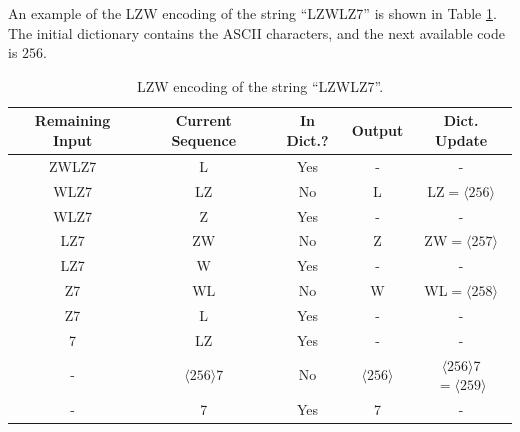 An example of the LZW encoding of the string ``LZWLZ7'' is shown in Table \ref{tab:lzw}. The initial dictionary contains the ASCII characters, and the next available code is $256$.
\begin{table}
    \centering
    \caption{LZW encoding of the string ``LZWLZ7''.}
    \renewcommand{\arraystretch}{1.2}
    \begin{tabular}{|c|c|c|c|c|}
        \hline
        \rowcolor{header}
        \textbf{\color{white}Remaining Input} & \textbf{\color{white}Current Sequence} & \textbf{\color{white}In Dict.?} & \textbf{\color{white}Output} & \textbf{\color{white}Dict. Update} \\ \hline
        ZWLZ7 & L & Yes & - & - \\ \hline\rowcolor{notindict}
        WLZ7 & LZ & No & L & LZ$=\langle256\rangle$ \\ \hline
        WLZ7 & Z & Yes & - & - \\ \hline\rowcolor{notindict}
        LZ7 & ZW & No & Z & ZW$=\langle257\rangle$ \\ \hline
        LZ7 & W & Yes & - & - \\ \hline\rowcolor{notindict}
        Z7 & WL & No & W & WL$=\langle258\rangle$ \\ \hline
        Z7 & L & Yes & - & - \\ \hline
        7 & LZ & Yes & - & - \\ \hline\rowcolor{notindict}
        - & $\langle256\rangle$7 & No & $\langle256\rangle$ & $\langle256\rangle$7$=\langle259\rangle$ \\ \hline\rowcolor{notindict}
        - & 7 & Yes & 7 & - \\ \hline
    \end{tabular}
    \label{tab:lzw}
\end{table}

